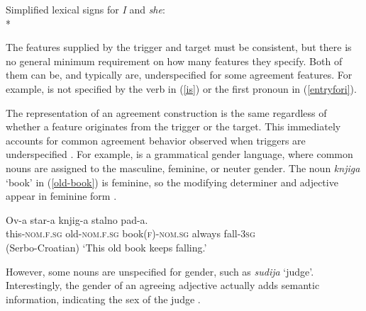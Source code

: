 \documentclass[output=paper
 	        ,biblatex
                ,babelshorthands
                ,newtxmath
                ,draftmode
                ,colorlinks, citecolor=brown
]{langscibook}
\begin{document}
\ea
\label{entryfori}
Simplified lexical signs for  \textit{I} and \textit{she}: \\*
\hspace{1cm}
\z

\eal
\label{sober}
\zl
 
\noindent
The features supplied by the trigger and target must be consistent, but 
there is no general minimum requirement on how many features they specify.  Both of them can be, and typically are, underspecified for some agreement features.  For example,  is not specified by the verb in (\ref{is}) or the first pronoun in (\ref{entryfori}).   

The representation of an agreement construction is the same regardless of whether a feature
originates from the trigger or the target. This immediately accounts for common agreement behavior observed when triggers are underspecified
\citep{Barlow:1988}. For example,  is a grammatical gender language, where
common nouns are assigned to the  masculine, feminine, or neuter gender. The noun \textit{knjiga}
`book’ in (\ref{old-book}) is feminine, so the modifying determiner and adjective appear in feminine
form \citep[4]{Wechsler+Zlatic:2003}. 

\begin{exe}
\ex \label{old-book}
\gll Ov-a	            star-a                knjig-a              stalno  pad-a. \\
     this-\textsc{nom.f.sg} old-\textsc{nom.f.sg} book(\textsc{f})-\textsc{nom.sg} always  fall-\textsc{3sg} \\\hfill(Serbo-Croatian)
\glt `This old book keeps falling.' 
\end{exe} 


\noindent
However, some nouns are unspecified for gender, such as \textit{sudija}  `judge’.  Interestingly, the gender of an agreeing adjective actually adds semantic information, indicating the sex of the judge \citep[42, example\,(23)]{Wechsler+Zlatic:2003}.
\end{document}
